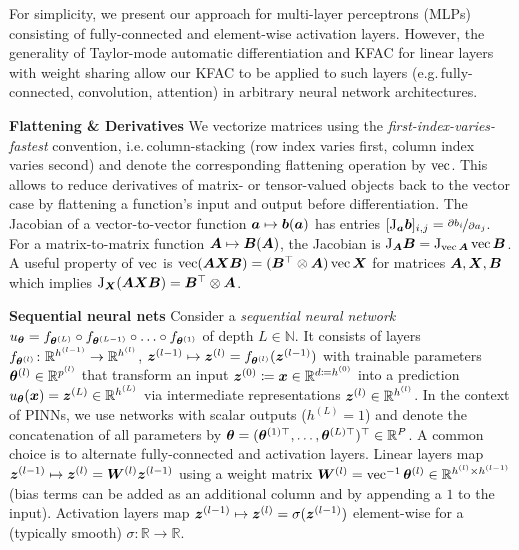 For simplicity, we present our approach for multi-layer perceptrons (MLPs) consisting of fully-connected and element-wise activation layers.
However, the generality of Taylor-mode automatic differentiation and KFAC for linear layers with weight sharing allow our KFAC to be applied to such layers (e.g.\,fully-connected, convolution, attention) in arbitrary neural network architectures.

\textbf{Flattening \& Derivatives}
We vectorize matrices using the \emph{first-index-varies-fastest} convention, i.e.\,column-stacking (row index varies first, column index varies second) and denote the corresponding flattening operation by $\operatorname{vec}$.
This allows to reduce derivatives of matrix- or tensor-valued objects back to the vector case by flattening a function's input and output before differentiation.
The Jacobian of a vector-to-vector function ${\bm{a}} \mapsto {\bm{b}}({\bm{a}})$ has entries $[\mathrm{J}_{{\bm{a}}}{\bm{b}}]_{i,j} = \nicefrac{\partial {b}_i}{\partial {a}_j}$.
For a matrix-to-matrix function ${\bm{A}} \mapsto {\bm{B}}({\bm{A}})$, the Jacobian is $\mathrm{J}_{{\bm{A}}} {\bm{B}} = \mathrm{J}_{\operatorname{vec} {\bm{A}} }\operatorname{vec}{\bm{B}}$.
A useful property of $\operatorname{vec}$ is $\operatorname{vec}({\bm{A}}{\bm{X}}{\bm{B}}) = ({\bm{B}}^\top\otimes {\bm{A}})\operatorname{vec}{{\bm{X}}}$ for matrices ${\bm{A}}, {\bm{X}}, {\bm{B}}$ which implies $\mathrm{J}_{\bm{X}}({\bm{A}}{\bm{X}}{\bm{B}}) = {\bm{B}}^\top\otimes {\bm{A}}$.

\textbf{Sequential neural nets} Consider a \emph{sequential neural network} $u_{{\bm{\theta}}} = f_{{\bm{\theta}}^{(L)}} \circ f_{{\bm{\theta}}^{(L-1)}} \circ \ldots \circ f_{{\bm{\theta}}^{(1)}} $ of depth $L\in\mathbb N$. It consists of layers $f_{{\bm{\theta}}^{(l)}}\colon {\mathbb{R}}^{h^{(l-1)}}\to{\mathbb{R}}^{h^{(l)}}$, ${\bm{z}}^{(l-1)}\mapsto {\bm{z}}^{(l)} = f_{{\bm{\theta}}^{(l)}}({\bm{z}}^{(l-1)})$ with trainable parameters ${\bm{\theta}}^{(l)} \in {\mathbb{R}}^{p^{(l)}}$ that transform an input ${\bm{z}}^{(0)} \coloneqq {\bm{x}} \in \mathbb R^{d \coloneqq h^{(0)}}$ into a prediction $u_{\bm{\theta}}({\bm{x}}) = {\bm{z}}^{(L)} \in {\mathbb{R}}^{h^{(L)}}$ via intermediate representations ${\bm{z}}^{(l)} \in {\mathbb{R}}^{h^{(l)}}$.
In the context of PINNs, we use networks with scalar outputs ($h^{(L)}=1$) and denote the concatenation of all parameters by ${\bm{\theta}} = ({\bm{\theta}}^{(1)\top}, \dots, {\bm{\theta}}^{(L)\top})^{\top} \in {\mathbb{R}}^P$.
A common choice is to alternate fully-connected and activation layers.
Linear layers map ${\bm{z}}^{(l-1)} \mapsto {\bm{z}}^{(l)} = {\bm{W}}^{(l)} {\bm{z}}^{(l-1)}$ using a weight matrix ${\bm{W}}^{(l)} = \operatorname{vec}^{-1}{\bm{\theta}}^{(l)}  \in {\mathbb{R}}^{h^{(l)} \times h^{(l-1)}}$ (bias terms can be added as an additional column and by appending a $1$ to the input).
Activation layers map ${\bm{z}}^{(l-1)}\mapsto {\bm{z}}^{(l)} = \sigma({\bm{z}}^{(l-1)})$ element-wise for a (typically smooth) $\sigma\colon\mathbb R\to\mathbb R$.

